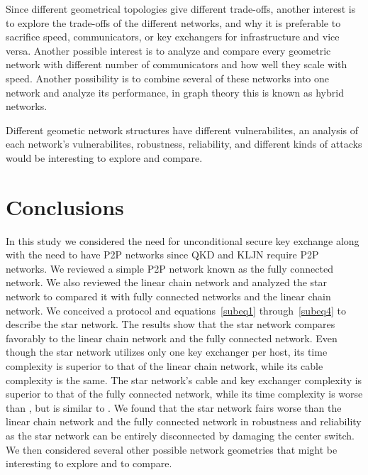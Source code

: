 \documentclass[a4paper,12pt,pdftex]{article}
\begin{document}
Since different geometrical topologies give different trade-offs, another interest is to explore the trade-offs of the different networks, and why it is preferable to sacrifice speed, communicators, or key exchangers for infrastructure and vice versa. Another possible interest is to analyze and compare every geometric network with different number of communicators and how well they scale with speed. Another possibility is to combine several of these networks into one network and analyze its performance, in graph theory this is known as hybrid networks.

Different geometic network structures have different vulnerabilites, an analysis of each network's vulnerabilites, robustness, reliability, and different kinds of attacks would be interesting to explore and compare. 


\section{Conclusions}

In this study we considered the need for unconditional secure key exchange along with the need to have P2P networks since QKD and KLJN require P2P networks. We reviewed a simple P2P network known as the fully connected network. We also reviewed the linear chain network and analyzed the star network to compared it with fully connected networks and the linear chain network. We conceived a protocol and equations~\eqref{subeq1} through~\eqref{subeq4} to describe the star network. The results show that the star network compares favorably to the linear chain network and the fully connected network. Even though the star network utilizes only one key exchanger per host, its time complexity is superior to that of the linear chain network, while its cable complexity is the same. The star network's cable and key exchanger complexity is superior to that of the fully connected network, while its time complexity is worse than , but is similar to . We found that the star network fairs worse than the linear chain network and the fully connected network in robustness and reliability as the star network can be entirely disconnected by damaging the center switch. We then considered several other possible network geometries that might be interesting to explore and to compare.
\end{document}
